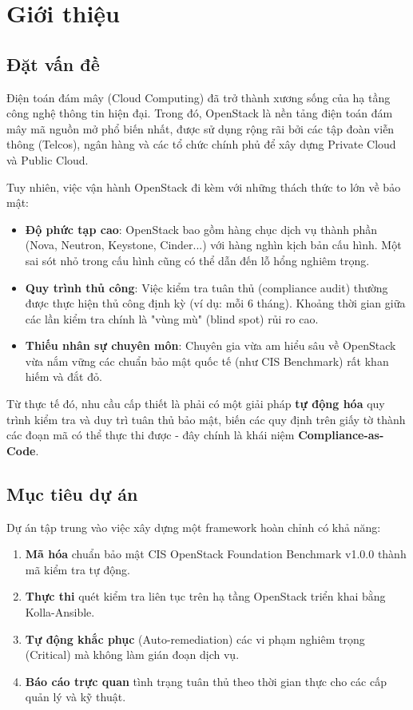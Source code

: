\documentclass[12pt,a4paper]{report}
\begin{document}
\chapter{Giới thiệu}

\section{Đặt vấn đề}
Điện toán đám mây (Cloud Computing) đã trở thành xương sống của hạ tầng công nghệ thông tin hiện đại. Trong đó, OpenStack là nền tảng điện toán đám mây mã nguồn mở phổ biến nhất, được sử dụng rộng rãi bởi các tập đoàn viễn thông (Telcos), ngân hàng và các tổ chức chính phủ để xây dựng Private Cloud và Public Cloud.

Tuy nhiên, việc vận hành OpenStack đi kèm với những thách thức to lớn về bảo mật:
\begin{itemize}
    \item \textbf{Độ phức tạp cao}: OpenStack bao gồm hàng chục dịch vụ thành phần (Nova, Neutron, Keystone, Cinder...) với hàng nghìn kịch bản cấu hình. Một sai sót nhỏ trong cấu hình cũng có thể dẫn đến lỗ hổng nghiêm trọng.
    \item \textbf{Quy trình thủ công}: Việc kiểm tra tuân thủ (compliance audit) thường được thực hiện thủ công định kỳ (ví dụ: mỗi 6 tháng). Khoảng thời gian giữa các lần kiểm tra chính là "vùng mù" (blind spot) rủi ro cao.
    \item \textbf{Thiếu nhân sự chuyên môn}: Chuyên gia vừa am hiểu sâu về OpenStack vừa nắm vững các chuẩn bảo mật quốc tế (như CIS Benchmark) rất khan hiếm và đắt đỏ.
\end{itemize}

Từ thực tế đó, nhu cầu cấp thiết là phải có một giải pháp \textbf{tự động hóa} quy trình kiểm tra và duy trì tuân thủ bảo mật, biến các quy định trên giấy tờ thành các đoạn mã có thể thực thi được - đây chính là khái niệm \textbf{Compliance-as-Code}.

\section{Mục tiêu dự án}
Dự án tập trung vào việc xây dựng một framework hoàn chỉnh có khả năng:
\begin{enumerate}
    \item \textbf{Mã hóa} chuẩn bảo mật CIS OpenStack Foundation Benchmark v1.0.0 thành mã kiểm tra tự động.
    \item \textbf{Thực thi} quét kiểm tra liên tục trên hạ tầng OpenStack triển khai bằng Kolla-Ansible.
    \item \textbf{Tự động khắc phục} (Auto-remediation) các vi phạm nghiêm trọng (Critical) mà không làm gián đoạn dịch vụ.
    \item \textbf{Báo cáo trực quan} tình trạng tuân thủ theo thời gian thực cho các cấp quản lý và kỹ thuật.
\end{enumerate}
\end{document}
